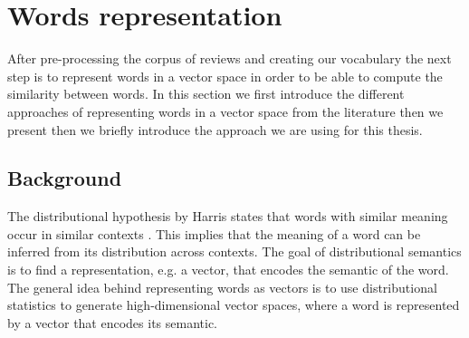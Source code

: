 \documentclass{article}
\begin{document}
\section{Words representation}
After pre-processing the corpus of reviews and creating our vocabulary the next step is to represent words in a vector space in order to be able to compute the similarity between words.
In this section we first introduce the different approaches of representing words in a vector space from the literature then we present then we briefly introduce the approach we are using for this thesis.

\subsection{Background}

The distributional hypothesis by Harris states that words with similar meaning occur in similar contexts \cite{harris:1954}. This
implies that the meaning of a word can be inferred from its distribution across contexts. The goal of distributional semantics
is to find a representation, e.g. a vector, that encodes the semantic of the word.
The general idea behind representing words as vectors is to use distributional statistics to generate high-dimensional vector
spaces, where a word is represented by a vector that encodes its semantic.
\end{document}
